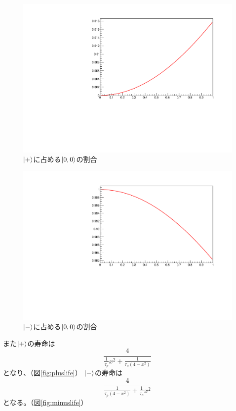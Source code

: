 \begin{figure}[H]
\centering
\includegraphics[keepaspectratio,angle=270,scale=0.6]{fig/ybm/plusstate.pdf}
\caption{$\ket{+}$に占める$\ket{0,0}$の割合}
\label{fig:plusstate}
\end{figure}

\begin{figure}[H]
\centering
\includegraphics[keepaspectratio,angle=270,scale=0.6]{fig/ybm/minusstate.pdf}
\caption{$\ket{-}$に占める$\ket{0,0}$の割合}
\label{fig:minusstate}
\end{figure}

また$\ket{+}$の寿命は
\begin{equation}
	\nonumber
\frac{4}{\frac{1}{\tau_{p}}x^{2}+\frac{1}{\tau_{o}(4-x^{2})}}
\end{equation}
となり、（図\ref{fig:pluslife}）
$\ket{-}$の寿命は
\begin{equation}
	\nonumber
\frac{4}{\frac{1}{\tau_{p}(4-x^{2})}+\frac{1}{\tau_{o}}x^{2}}
\end{equation}
となる。（図\ref{fig:minuslife}）

